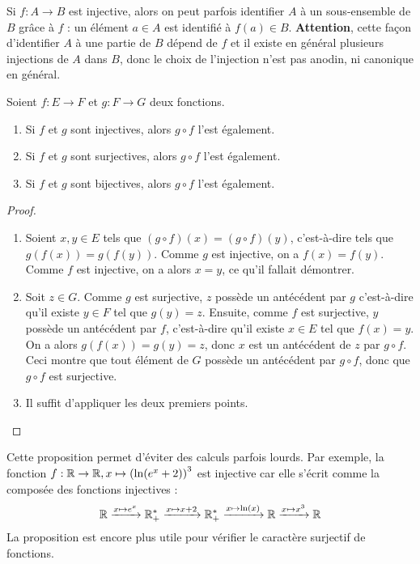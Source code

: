 \begin{remarque}
Si $f : A\to B$ est injective, alors on peut parfois \og identifier\fg{} $A$ à un sous-ensemble de $B$ grâce à $f$ : un élément $a \in A$ est identifié à $f(a) \in B$. \textbf{Attention}, cette façon d'identifier $A$ à une partie de $B$ dépend de $f$ et il existe en général plusieurs injections de $A$ dans $B$, donc le choix de l'injection n'est pas anodin, ni canonique en général.
\end{remarque}


\begin{proposition}\label{prop-composition-inj-surj-bij}
Soient $f : E\to F$ et $g : F\to G$ deux fonctions.
\begin{enumerate}
\item Si $f$ et $g$ sont injectives, alors $g\circ f$ l'est également.
\item Si $f$ et $g$ sont surjectives, alors $g\circ f$ l'est également.
\item Si $f$ et $g$ sont bijectives, alors $g\circ f$ l'est également.
\end{enumerate}
\end{proposition}
\begin{proof}
\begin{enumerate}
\item Soient $x, y \in E$ tels que $(g\circ f)(x) = (g\circ f)(y) $, c'est-à-dire tels que $g(f(x))=g(f(y))$. Comme $g$ est injective, on a $f(x)=f(y)$. Comme $f$ est injective, on a alors $x=y$, ce qu'il fallait démontrer.
\item Soit $z\in G$. Comme $g$ est surjective, $z$ possède un antécédent par $g$ c'est-à-dire qu'il existe $y\in F$ tel que $g(y)=z$. Ensuite, comme $f$ est surjective, $y$ possède un antécédent par $f$, c'est-à-dire qu'il existe $x\in E$ tel que $f(x)=y$. On a alors $g(f(x)) = g(y)=z$, donc $x$ est un antécédent de $z$ par $g\circ f$. Ceci montre que tout élément de $G$ possède un antécédent par $g\circ f$, donc que $g\circ f$ est surjective.
\item Il suffit d'appliquer les deux premiers points.
\end{enumerate}
\end{proof}



\begin{exemple}
Cette proposition permet d'éviter des calculs parfois lourds. Par exemple, la fonction $f : \mathbb{R}\to \mathbb{R}, x\mapsto \left(\ln(e^x+2)\right)^3$ est injective car elle s'écrit comme la composée des fonctions injectives :
\[ \mathbb{R} \xrightarrow{x\mapsto e^x} \mathbb{R}_+^* \xrightarrow{x\mapsto x+2} \mathbb{R}_+^* \xrightarrow{x\mapsto \ln(x)} \mathbb{R} \xrightarrow{x\mapsto x^3}\mathbb{R}\]
La proposition est encore plus utile pour vérifier le caractère surjectif de fonctions.
\end{exemple}

